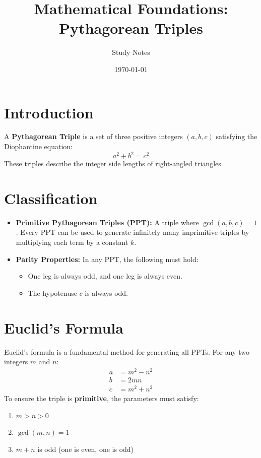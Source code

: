 \documentclass[12pt]{article}
\title{Mathematical Foundations: Pythagorean Triples}
\author{Study Notes}
\date{\today}
\begin{document}
\maketitle

\section{Introduction}
A \textbf{Pythagorean Triple} is a set of three positive integers $(a, b, c)$ satisfying the Diophantine equation:
\begin{equation}
    a^2 + b^2 = c^2
\end{equation}
These triples describe the integer side lengths of right-angled triangles.

\section{Classification}
\begin{itemize}
    \item \textbf{Primitive Pythagorean Triples (PPT):} A triple where $\gcd(a, b, c) = 1$. Every PPT can be used to generate infinitely many imprimitive triples by multiplying each term by a constant $k$.
    \item \textbf{Parity Properties:} In any PPT, the following must hold:
    \begin{itemize}
        \item One leg is always odd, and one leg is always even.
        \item The hypotenuse $c$ is always odd.
    \end{itemize}
\end{itemize}

\section{Euclid's Formula}
Euclid's formula is a fundamental method for generating all PPTs. For any two integers $m$ and $n$:
\begin{align*}
    a &= m^2 - n^2 \\
    b &= 2mn \\
    c &= m^2 + n^2
\end{align*}
To ensure the triple is \textbf{primitive}, the parameters must satisfy:
\begin{enumerate}
    \item $m > n > 0$
    \item $\gcd(m, n) = 1$
    \item $m+n$ is odd (one is even, one is odd)
\end{enumerate}
\end{document}
